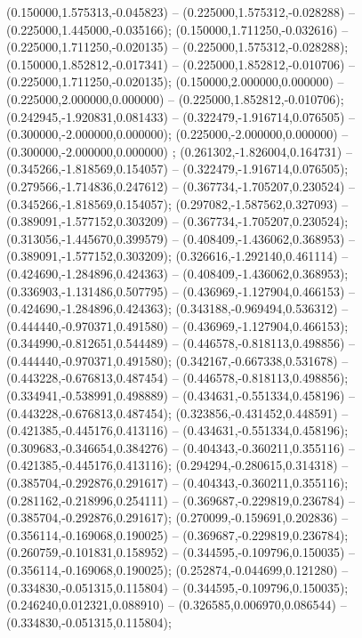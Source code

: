  (0.150000,1.575313,-0.045823) -- (0.225000,1.575312,-0.028288) -- (0.225000,1.445000,-0.035166);
 (0.150000,1.711250,-0.032616) -- (0.225000,1.711250,-0.020135) -- (0.225000,1.575312,-0.028288);
 (0.150000,1.852812,-0.017341) -- (0.225000,1.852812,-0.010706) -- (0.225000,1.711250,-0.020135);
 (0.150000,2.000000,0.000000) -- (0.225000,2.000000,0.000000) -- (0.225000,1.852812,-0.010706);
 (0.242945,-1.920831,0.081433) -- (0.322479,-1.916714,0.076505) -- (0.300000,-2.000000,0.000000);
 (0.225000,-2.000000,0.000000) -- (0.300000,-2.000000,0.000000) ;
 (0.261302,-1.826004,0.164731) -- (0.345266,-1.818569,0.154057) -- (0.322479,-1.916714,0.076505);
 (0.279566,-1.714836,0.247612) -- (0.367734,-1.705207,0.230524) -- (0.345266,-1.818569,0.154057);
 (0.297082,-1.587562,0.327093) -- (0.389091,-1.577152,0.303209) -- (0.367734,-1.705207,0.230524);
 (0.313056,-1.445670,0.399579) -- (0.408409,-1.436062,0.368953) -- (0.389091,-1.577152,0.303209);
 (0.326616,-1.292140,0.461114) -- (0.424690,-1.284896,0.424363) -- (0.408409,-1.436062,0.368953);
 (0.336903,-1.131486,0.507795) -- (0.436969,-1.127904,0.466153) -- (0.424690,-1.284896,0.424363);
 (0.343188,-0.969494,0.536312) -- (0.444440,-0.970371,0.491580) -- (0.436969,-1.127904,0.466153);
 (0.344990,-0.812651,0.544489) -- (0.446578,-0.818113,0.498856) -- (0.444440,-0.970371,0.491580);
 (0.342167,-0.667338,0.531678) -- (0.443228,-0.676813,0.487454) -- (0.446578,-0.818113,0.498856);
 (0.334941,-0.538991,0.498889) -- (0.434631,-0.551334,0.458196) -- (0.443228,-0.676813,0.487454);
 (0.323856,-0.431452,0.448591) -- (0.421385,-0.445176,0.413116) -- (0.434631,-0.551334,0.458196);
 (0.309683,-0.346654,0.384276) -- (0.404343,-0.360211,0.355116) -- (0.421385,-0.445176,0.413116);
 (0.294294,-0.280615,0.314318) -- (0.385704,-0.292876,0.291617) -- (0.404343,-0.360211,0.355116);
 (0.281162,-0.218996,0.254111) -- (0.369687,-0.229819,0.236784) -- (0.385704,-0.292876,0.291617);
 (0.270099,-0.159691,0.202836) -- (0.356114,-0.169068,0.190025) -- (0.369687,-0.229819,0.236784);
 (0.260759,-0.101831,0.158952) -- (0.344595,-0.109796,0.150035) -- (0.356114,-0.169068,0.190025);
 (0.252874,-0.044699,0.121280) -- (0.334830,-0.051315,0.115804) -- (0.344595,-0.109796,0.150035);
 (0.246240,0.012321,0.088910) -- (0.326585,0.006970,0.086544) -- (0.334830,-0.051315,0.115804);
